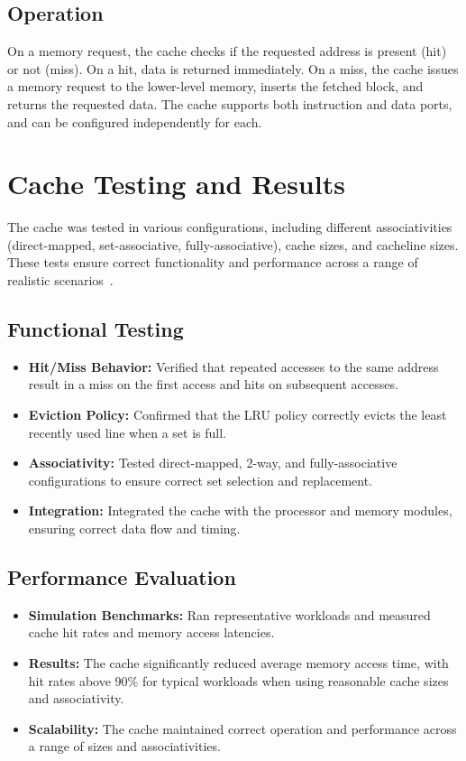 \documentclass[12pt,a4paper]{report}
\begin{document}
\subsection{Operation}
On a memory request, the cache checks if the requested address is present (hit) or not (miss). On a hit, data is returned immediately. On a miss, the cache issues a memory request to the lower-level memory, inserts the fetched block, and returns the requested data. The cache supports both instruction and data ports, and can be configured independently for each.

\section{Cache Testing and Results}
The cache was tested in various configurations, including different associativities (direct-mapped, set-associative, fully-associative), cache sizes, and cacheline sizes. These tests ensure correct functionality and performance across a range of realistic scenarios~\cite{pyarchsim_mohammed,pyarchsim_hawajkm,cache_adeorha}.


\subsection{Functional Testing}
\begin{itemize}
  \item \textbf{Hit/Miss Behavior:} Verified that repeated accesses to the same address result in a miss on the first access and hits on subsequent accesses.
  \item \textbf{Eviction Policy:} Confirmed that the LRU policy correctly evicts the least recently used line when a set is full.
  \item \textbf{Associativity:} Tested direct-mapped, 2-way, and fully-associative configurations to ensure correct set selection and replacement.
  \item \textbf{Integration:} Integrated the cache with the processor and memory modules, ensuring correct data flow and timing.
\end{itemize}

\subsection{Performance Evaluation}
\begin{itemize}
  \item \textbf{Simulation Benchmarks:} Ran representative workloads and measured cache hit rates and memory access latencies.
  \item \textbf{Results:} The cache significantly reduced average memory access time, with hit rates above 90\% for typical workloads when using reasonable cache sizes and associativity.
  \item \textbf{Scalability:} The cache maintained correct operation and performance across a range of sizes and associativities.
\end{itemize}
\end{document}
